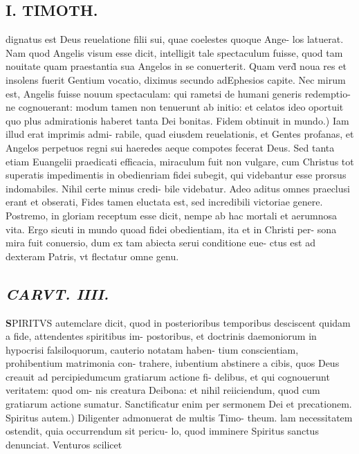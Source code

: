 \documentclass{article}
\begin{document}
\begin{pages}
\section*{I. TIMOTH. }
\marginpar{[ p.42 ]}\pstart dignatus est Deus reuelatione filii sui, quae coelestes quoque Ange- los latuerat. Nam quod Angelis visum esse dicit, intelligit tale spectaculum fuisse, quod tam nouitate quam praestantia sua Angelos in se conuerterit. Quam verd̀ noua res et insolens fuerit Gentium vocatio, diximus secundo adEphesios capite. Nec mirum est, Angelis fuisse nouum spectaculam: qui rametsi de humani generis redemptio- ne cognouerant: modum tamen non tenuerunt ab initio: et celatos ideo oportuit quo plus admirationis haberet tanta Dei bonitas.  \pend\pstart Fidem obtinuit in mundo.) Iam illud erat imprimis admi- rabile, quad eiusdem reuelationis, et Gentes profanas, et Angelos perpetuos regni sui haeredes aeque compotes fecerat Deus. Sed tanta etiam Euangelii praedicati efficacia, miraculum fuit non vulgare, cum Christus tot superatis impedimentis in obedienriam fidei subegit, qui videbantur esse prorsus indomabiles. Nihil certe minus credi- bile videbatur. Adeo aditus omnes praeclusi erant et obserati, Fides tamen eluctata est, sed incredibili victoriae genere. Postremo, in gloriam receptum esse dicit, nempe ab hac mortali et aerumnosa vita. Ergo sicuti in mundo quoad fidei obedientiam, ita et in Christi per- sona mira fuit conuersio, dum ex tam abiecta serui conditione eue- ctus est ad dexteram Patris, vt flectatur omne genu.  \pend
{}
{}
\subsection*{\textit{CARVT. IIII. }}\pstart \huge\textbf{S}\normalsize PIRITVS autemclare dicit, quod in posterioribus temporibus desciscent quidam a fide, attendentes spiritibus im- postoribus, et doctrinis daemoniorum in hypocrisi falsiloquorum, cauterio notatam haben- tium conscientiam, prohibentium matrimonia con- trahere, iubentium abstinere a cibis, quos Deus creauit ad percipiedumcum gratiarum actione fi- delibus, et qui cognouerunt veritatem: quod om- nis creatura Deibona: et nihil reiiciendum, quod cum gratiarum actione sumatur. Sanctificatur enim per sermonem Dei et precationem.  \pend\pstart Spiritus autem.) Diligenter admonuerat de multis Timo- theum. lam necessitatem ostendit, quia occurrendum sit pericu- lo, quod imminere Spiritus sanctus denunciat. Venturos scilicet  \pend
{}
{}

\end{pages}
\end{document}
